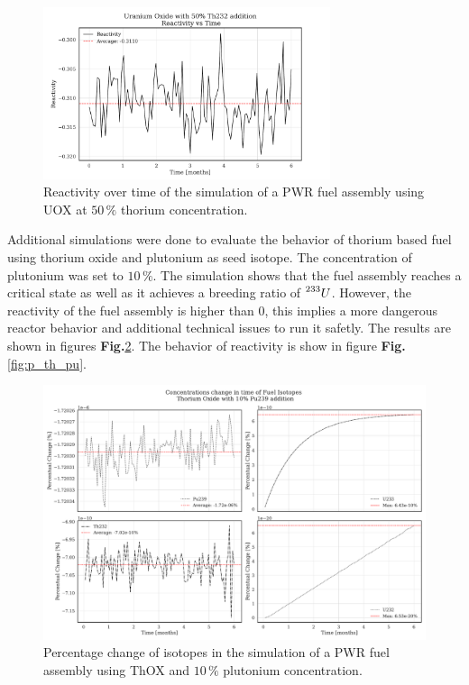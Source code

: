\begin{figure}[h]
    \centering
    \includegraphics[width=0.75\textwidth, scale = 0.5]{Kap7/Figures_Kap7/Reactivity_vs_Time_UOX_50.pdf}
    \caption{Reactivity over time of the simulation of a PWR fuel assembly using UOX at \(50 \, \%\) thorium concentration.}
    \label{fig:p_10}
\end{figure}

Additional simulations were done to evaluate the behavior of thorium based fuel using thorium oxide and plutonium as seed isotope. The concentration of plutonium was set to \(10 \, \%\). The simulation shows that the fuel assembly reaches a critical state as well as it achieves a breeding ratio of \(\prescript{233}{}{U}\). However, the reactivity of the fuel assembly is higher than \(0\), this implies a more dangerous reactor behavior and additional technical issues to run it safetly. The results are shown in figures \textbf{Fig.}\ref{fig:th_pu}. The behavior of reactivity is show in figure \textbf{Fig.}\ref{fig:p_th_pu}.   

\begin{figure}[h]
    \centering
    \includegraphics[width=1\textwidth]{Kap7/Figures_Kap7/percentual_change_th232_Pu239.pdf}
    \caption{Percentage change of isotopes in the simulation of a PWR fuel assembly using ThOX and \(10 \, \%\) plutonium concentration.}
    \label{fig:th_pu}
\end{figure}  


